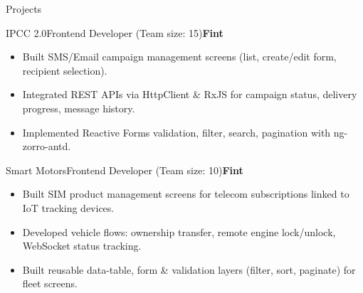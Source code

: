 \documentclass[]{style}
\newcommand{\bolddate}[1]{\textbf{#1}}
\begin{document}
\begin{section}{Projects}

\begin{projectsubsection}{IPCC 2.0}{Frontend Developer (Team size: 15)}{\bolddate{Fint}}{}
\begin{itemize}
  \item Built SMS/Email campaign management screens (list, create/edit form, recipient selection).
  \item Integrated REST APIs via HttpClient \& RxJS for campaign status, delivery progress, message history.
  \item Implemented Reactive Forms validation, filter, search, pagination with ng-zorro-antd.
\end{itemize}
\end{projectsubsection}


\begin{projectsubsection}{Smart Motors}{Frontend Developer (Team size: 10)}{\bolddate{Fint}}{}
\begin{itemize}
  \item Built SIM product management screens for telecom subscriptions linked to IoT tracking devices.
  \item Developed vehicle flows: ownership transfer, remote engine lock/unlock, WebSocket status tracking.
  \item Built reusable data-table, form \& validation layers (filter, sort, paginate) for fleet screens.
\end{itemize}
\end{projectsubsection}



\end{section}
\end{document}
